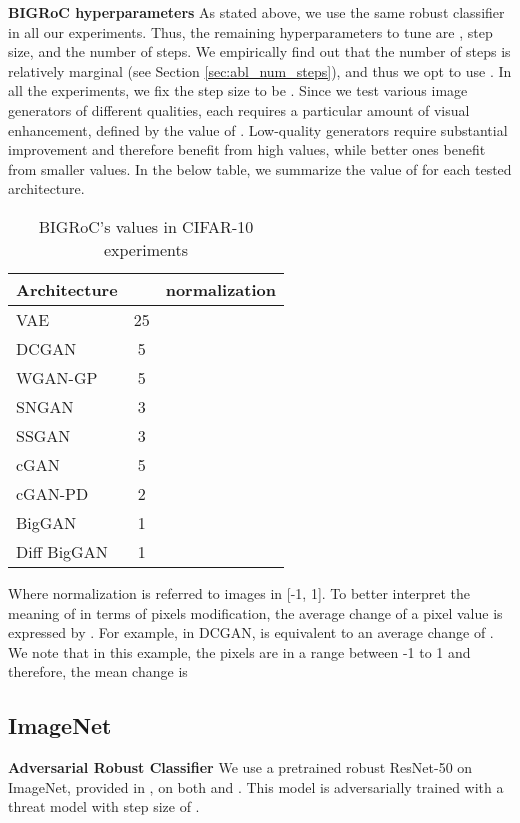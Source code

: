\documentclass[10pt]{article} \usepackage[accepted]{tmlr}
\newcommand{\cmark}{\ding{51}}\newcommand{\xmark}{\ding{55}}\DeclarePairedDelimiter{\norm}{\lVert}{\rVert}
\begin{document}
\noindent \textbf{BIGRoC hyperparameters}
As stated above, we use the same robust classifier in all our experiments.
Thus, the remaining hyperparameters to tune are , step size, and the number of steps.
We empirically find out that the number of steps is relatively marginal (see Section \ref{sec:abl_num_steps}), and thus we opt to use .
In all the experiments, we fix the step size to be .
Since we test various image generators of different qualities, each requires a particular amount of visual enhancement, defined by the value of .
Low-quality generators require substantial improvement and therefore benefit from high  values, while better ones benefit from smaller values.
In the below table, we summarize the value of  for each tested architecture.

\begin{table}[ht]
\caption{BIGRoC's  values in CIFAR-10 experiments}
\begin{center}
\begin{small}
\begin{sc}
\begin{tabular}{lcc}
\toprule
Architecture &  & normalization\\
\midrule
VAE & 25 & \cmark\\
DCGAN & 5 & \cmark\\
WGAN-GP & 5 & \cmark\\
SNGAN & 3 & \cmark\\
SSGAN & 3 & \cmark\\
\hline
cGAN & 5 & \cmark\\
cGAN-PD & 2 & \cmark\\
BigGAN & 1 & \cmark\\
Diff BigGAN & 1 & \cmark\\
\bottomrule
\end{tabular}
\end{sc}
\end{small}
\end{center}
\label{tab:eps_values}
\end{table}

\noindent Where normalization is referred to images in [-1, 1].
To better interpret the meaning of  in terms of pixels modification, the average change of a pixel value is expressed by .
For example, in DCGAN,  is equivalent to an average change of .
We note that in this example, the pixels are in a range between -1 to 1 and therefore, the mean change is 

\subsection{ImageNet}
\label{sec:imp_det_IN}
\noindent \textbf{Adversarial Robust Classifier} We use a pretrained robust ResNet-50 on ImageNet, provided in \citep{robustness}, on both  and . This model is adversarially trained with a threat model  with step size of .
\end{document}
